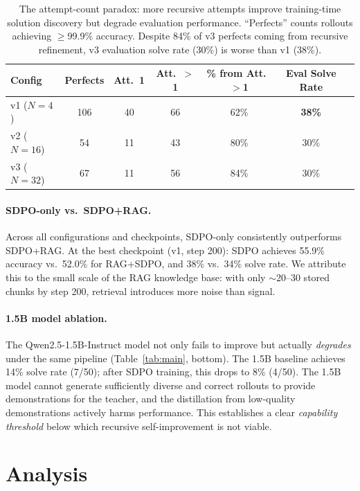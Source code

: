 \documentclass[11pt]{article}
\begin{document}
\begin{table}[h]
\centering
\begin{tabular}{lcccccc}
\toprule
\textbf{Config} & \textbf{Perfects} & \textbf{Att.\ 1} & \textbf{Att.\ $>$1} & \textbf{\% from Att.\ $>$1} & \textbf{Eval Solve Rate} \\
\midrule
v1 ($N{=}4$)  & 106 & 40 & 66 & 62\% & \textbf{38\%} \\
v2 ($N{=}16$) & 54  & 11 & 43 & 80\% & 30\% \\
v3 ($N{=}32$) & 67  & 11 & 56 & 84\% & 30\% \\
\bottomrule
\end{tabular}
\caption{The attempt-count paradox: more recursive attempts improve training-time solution discovery but degrade evaluation performance. ``Perfects'' counts rollouts achieving $\geq$99.9\% accuracy. Despite 84\% of v3 perfects coming from recursive refinement, v3 evaluation solve rate (30\%) is worse than v1 (38\%).}
\label{tab:perfects}
\end{table}

\paragraph{SDPO-only vs.\ SDPO+RAG.} Across all configurations and checkpoints, SDPO-only consistently outperforms SDPO+RAG. At the best checkpoint (v1, step 200): SDPO achieves 55.9\% accuracy vs.\ 52.0\% for RAG+SDPO, and 38\% vs.\ 34\% solve rate. We attribute this to the small scale of the RAG knowledge base: with only $\sim$20--30 stored chunks by step 200, retrieval introduces more noise than signal.

\paragraph{1.5B model ablation.} The Qwen2.5-1.5B-Instruct model not only fails to improve but actually \emph{degrades} under the same pipeline (Table~\ref{tab:main}, bottom). The 1.5B baseline achieves 14\% solve rate (7/50); after SDPO training, this drops to 8\% (4/50). The 1.5B model cannot generate sufficiently diverse and correct rollouts to provide demonstrations for the teacher, and the distillation from low-quality demonstrations actively harms performance. This establishes a clear \emph{capability threshold} below which recursive self-improvement is not viable.

\section{Analysis}
\end{document}

